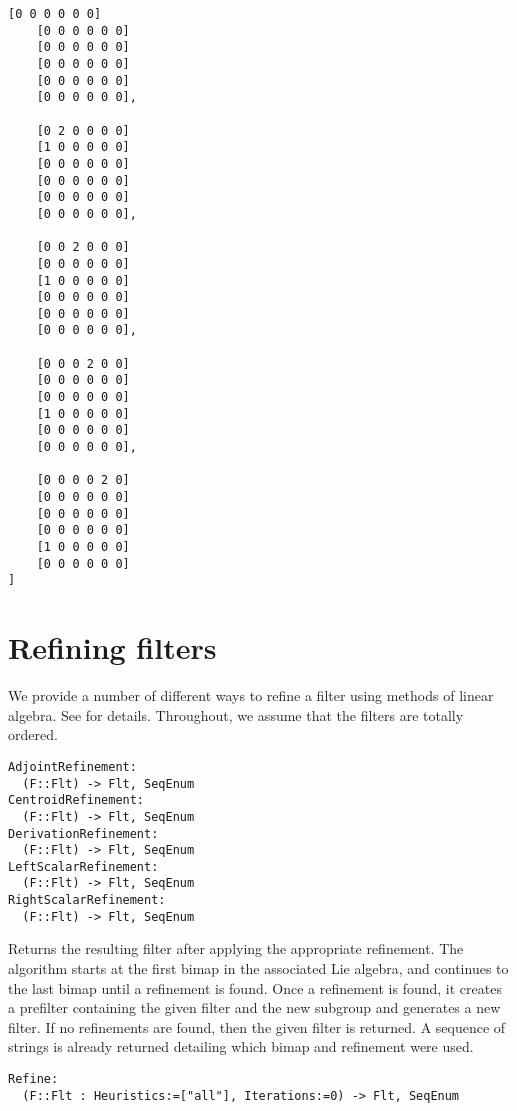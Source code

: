 \documentclass{amsart}
\begin{document}
{\begin{lstlisting}[frame=single,basicstyle=\ttfamily\color{black!30!teal},backgroundcolor=\color{white!70!gray}]
    [0 0 0 0 0 0]
    [0 0 0 0 0 0]
    [0 0 0 0 0 0]
    [0 0 0 0 0 0]
    [0 0 0 0 0 0]
    [0 0 0 0 0 0],

    [0 2 0 0 0 0]
    [1 0 0 0 0 0]
    [0 0 0 0 0 0]
    [0 0 0 0 0 0]
    [0 0 0 0 0 0]
    [0 0 0 0 0 0],

    [0 0 2 0 0 0]
    [0 0 0 0 0 0]
    [1 0 0 0 0 0]
    [0 0 0 0 0 0]
    [0 0 0 0 0 0]
    [0 0 0 0 0 0],

    [0 0 0 2 0 0]
    [0 0 0 0 0 0]
    [0 0 0 0 0 0]
    [1 0 0 0 0 0]
    [0 0 0 0 0 0]
    [0 0 0 0 0 0],

    [0 0 0 0 2 0]
    [0 0 0 0 0 0]
    [0 0 0 0 0 0]
    [0 0 0 0 0 0]
    [1 0 0 0 0 0]
    [0 0 0 0 0 0]
]
\end{lstlisting}
}

\section{Refining filters}

We provide a number of different ways to refine a filter using methods of linear algebra. 
See \cites{W:Char,W:Filters} for details.
Throughout, we assume that the filters are totally ordered.

\color{blue}
\begin{verbatim}
AdjointRefinement:
  (F::Flt) -> Flt, SeqEnum
CentroidRefinement:
  (F::Flt) -> Flt, SeqEnum
DerivationRefinement:
  (F::Flt) -> Flt, SeqEnum
LeftScalarRefinement:
  (F::Flt) -> Flt, SeqEnum
RightScalarRefinement:
  (F::Flt) -> Flt, SeqEnum
\end{verbatim}
\color{black}

Returns the resulting filter after applying the appropriate refinement. 
The algorithm starts at the first bimap in the associated Lie algebra, and continues to the last bimap until a refinement is found.
Once a refinement is found, it creates a prefilter containing the given filter and the new subgroup and generates a new filter.
If no refinements are found, then the given filter is returned.
A sequence of strings is already returned detailing which bimap and refinement were used.

\color{blue}
\begin{verbatim}
Refine:
  (F::Flt : Heuristics:=["all"], Iterations:=0) -> Flt, SeqEnum
\end{verbatim}
\color{black}
\end{document}
